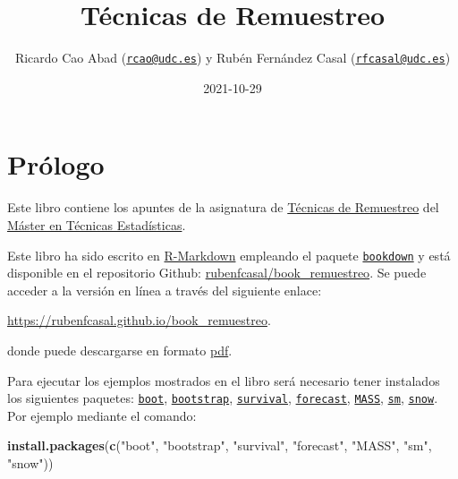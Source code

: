\documentclass[
]{book}
\title{Técnicas de Remuestreo}
\author{Ricardo Cao Abad (\href{mailto:rcao@udc.es}{\nolinkurl{rcao@udc.es}}) y Rubén Fernández Casal (\href{mailto:rfcasal@udc.es}{\nolinkurl{rfcasal@udc.es}})}
\date{2021-10-29}
\newenvironment{Shaded}{\begin{snugshade}}{\end{snugshade}}
\newcommand{\KeywordTok}[1]{\textcolor[rgb]{0.13,0.29,0.53}{\textbf{#1}}}
\newcommand{\NormalTok}[1]{#1}
\newcommand{\StringTok}[1]{\textcolor[rgb]{0.31,0.60,0.02}{#1}}
\theoremstyle{break}
\theoremstyle{definition}
\theoremstyle{definition}
\theoremstyle{definition}
\theoremstyle{remark}
\begin{document}
\maketitle

{
\setcounter{tocdepth}{1}
\tableofcontents
}
\hypertarget{pruxf3logo}{%
\chapter*{Prólogo}\label{pruxf3logo}}

Este libro contiene los apuntes de la asignatura de \href{http://eamo.usc.es/pub/mte/index.php/es/?option=com_content\&view=article\&id=2202\&idm=22\&a\%C3\%B1o=2019}{Técnicas de Remuestreo} del \href{http://eio.usc.es/pub/mte}{Máster en Técnicas Estadísticas}.

Este libro ha sido escrito en \href{http://rmarkdown.rstudio.com}{R-Markdown} empleando el paquete \href{https://bookdown.org/yihui/bookdown/}{\texttt{bookdown}} y está disponible en el repositorio Github: \href{https://github.com/rubenfcasal/book_remuestreo}{rubenfcasal/book\_remuestreo}.
Se puede acceder a la versión en línea a través del siguiente enlace:

\url{https://rubenfcasal.github.io/book_remuestreo}.

donde puede descargarse en formato \href{https://rubenfcasal.github.io/book_remuestreo/book_remuestreo.pdf}{pdf}.

Para ejecutar los ejemplos mostrados en el libro será necesario tener instalados los siguientes paquetes:
\href{https://CRAN.R-project.org/package=boot}{\texttt{boot}}, \href{https://CRAN.R-project.org/package=bootstrap}{\texttt{bootstrap}}, \href{https://CRAN.R-project.org/package=survival}{\texttt{survival}}, \href{https://CRAN.R-project.org/package=forecast}{\texttt{forecast}}, \href{https://CRAN.R-project.org/package=MASS}{\texttt{MASS}}, \href{https://CRAN.R-project.org/package=sm}{\texttt{sm}}, \href{https://CRAN.R-project.org/package=snow}{\texttt{snow}}.
Por ejemplo mediante el comando:

\begin{Shaded}
\begin{Highlighting}[]
\KeywordTok{install.packages}\NormalTok{(}\KeywordTok{c}\NormalTok{(}\StringTok{"boot"}\NormalTok{, }\StringTok{"bootstrap"}\NormalTok{, }\StringTok{"survival"}\NormalTok{, }\StringTok{"forecast"}\NormalTok{, }\StringTok{"MASS"}\NormalTok{, }\StringTok{"sm"}\NormalTok{, }\StringTok{"snow"}\NormalTok{))}
\end{Highlighting}
\end{Shaded}
\end{document}
